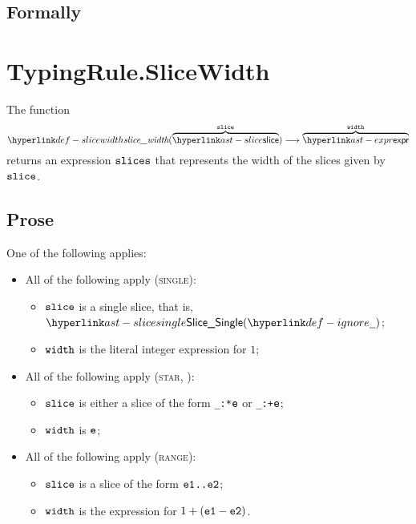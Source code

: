 \subsection{Formally}
\begin{mathpar}
\end{mathpar}

\begin{mathpar}
\end{mathpar}

\section{TypingRule.SliceWidth \label{sec:TypingRule.SliceWidth}}
\hypertarget{def-slicewidth}{}
The function
\[
  \slicewidth(\overname{\slice}{\vslice}) \aslto
  \overname{\expr}{\vwidth}
\]
returns an expression $\vslices$ that represents the width of the slices given by $\vslice$.

\subsection{Prose}
One of the following applies:
\begin{itemize}
  \item All of the following apply (\textsc{single}):
  \begin{itemize}
    \item $\vslice$ is a single slice, that is, $\SliceSingle(\Ignore)$;
    \item $\vwidth$ is the literal integer expression for $1$;
  \end{itemize}

  \item All of the following apply (\textsc{star}, ):
  \begin{itemize}
    \item $\vslice$ is either a slice of the form \texttt{\_:*$\ve$} or \texttt{\_:+$\ve$};
    \item $\vwidth$ is $\ve$;
  \end{itemize}

  \item All of the following apply (\textsc{range}):
  \begin{itemize}
    \item $\vslice$ is a slice of the form \texttt{$\veone$..$\vetwo$};
    \item $\vwidth$ is the expression for $1 + (\veone - \vetwo)$.
  \end{itemize}
\end{itemize}
